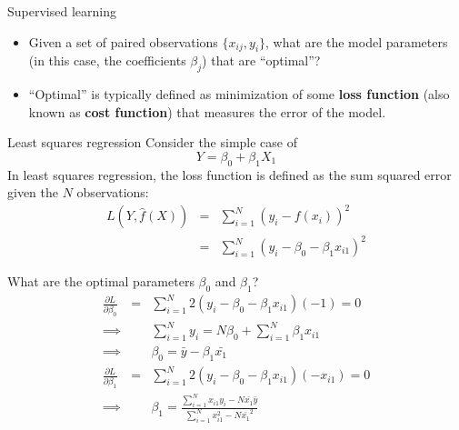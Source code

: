 \documentclass[aspectratio=169]{beamer}
\begin{document}
\begin{frame}{Supervised learning}
    \begin{itemize}
        \item Given a set of paired observations $\{x_{ij}, y_i\}$, what are the model parameters (in this case, the coefficients $\beta_j$) that are ``optimal''?
        \item ``Optimal'' is typically defined as minimization of some \textbf{loss function} (also known as \textbf{cost function}) that measures the error of the model.
    \end{itemize}
\end{frame}


\begin{frame}{Least squares regression}
    Consider the simple case of
    \begin{equation*}
        Y = \beta_0 + \beta_1 X_1
    \end{equation*}
    In least squares regression, the loss function is defined as the sum squared error given the $N$ observations:
    \begin{eqnarray*}
        L(Y, \hat{f}(X)) & = & \sum_{i=1}^N (y_i - f(x_i))^2 \\
        & = & \sum_{i=1}^N (y_i - \beta_0 - \beta_1 x_{i1})^2
    \end{eqnarray*}
    \end{frame}

    \begin{frame}{What are the optimal parameters $\beta_0$ and $\beta_1$?}
    \begin{eqnarray*}
        \frac{\partial L}{\partial\beta_0} & = & \sum_{i=1}^N 2 (y_i - \beta_0 - \beta_1 x_{i1})(-1) = 0\\
        \implies & & \sum_{i=1}^N y_i = N \beta_0 + \sum_{i=1}^N \beta_1 x_{i1} \\
        \implies & & \beta_0 = \bar{y} - \beta_1 \bar{x_{1}} \\
        \frac{\partial L}{\partial\beta_1} & = & \sum_{i=1}^N 2 (y_i - \beta_0 - \beta_1 x_{i1}) (-x_{i1}) = 0\\
        \implies & & \beta_1 = \frac{\sum_{i=1}^N x_{i1} y_i - N \bar{x_1}\bar{y}}{\sum_{i=1}^N x_{i1}^2 - N \bar{x_1}^2}\\
    \end{eqnarray*}
    \end{frame}
\end{document}
